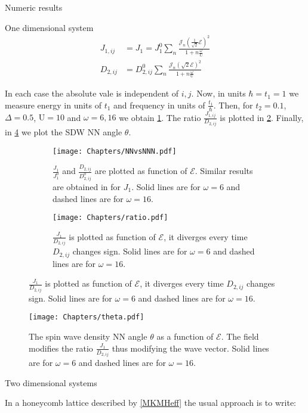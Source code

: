 \begin{section}{Numeric results}
\begin{subsection}{One dimensional system}
\begin{align}
J_{1,ij} &= J_{1} = J_{1}^0  \sum_{n} \frac{\mathcal{J}_n(\frac{1}{\sqrt{2}}\mathcal{E})^2}{1+n\frac{\omega}{\text{U}}} \\
D_{2,ij} &= D_{2,ij}^0  \sum_{n} \frac{\mathcal{J}_n(\sqrt{2}\mathcal{E})^2}{1+n\frac{\omega}{\text{U}}}
\end{align}

In each case the absolute vale is independent of $i,j$.  Now, in units $\hbar=t_1=1$ we measure energy in units of $t_1$ and frequency in units of $\frac{t_1}{\hbar}$. Then, for $t_2 = 0.1$, $\Delta = 0.5$, $\text{U} = 10$ and $\omega = 6, 16$ we obtain \ref{Fig1:NNvsNNN}. The ratio $\frac{J_{1,ij}}{D_{2,ij}}$ is plotted in \ref{Fig1:ratio}. Finally, in \ref{Fig2} we plot the SDW NN angle $\theta$.

\begin{figure}
\centering
\begin{subfigure}{.45\textwidth}
  \texttt{[image: Chapters/NNvsNNN.pdf]}
  \caption{$\frac{J_{1}}{J_{1}^0}$ and $\frac{D_{2,ij}}{D_{2,ij}^0}$ are plotted as function of $\mathcal{E}$. Similar results are obtained in \cite{Mentink2015} for $J_{1}$. Solid lines are for $\omega = 6$ and dashed lines are for $\omega = 16$.}
  \label{Fig1:NNvsNNN}
\end{subfigure}%
\hspace*{\fill}
\begin{subfigure}{.45\textwidth}
  \texttt{[image: Chapters/ratio.pdf]}
  \caption{$\frac{J_{1}}{D_{2,ij}}$ is plotted as function of $\mathcal{E}$, it diverges every time $D_{2,ij}$ changes sign. Solid lines are for $\omega = 6$ and dashed lines are for $\omega = 16$.}
  \label{Fig1:ratio}
\end{subfigure}
\label{Fig1}
\end{figure}

\begin{figure}
\centering
  \texttt{[image: Chapters/theta.pdf]}
  \caption{The spin wave density NN angle $\theta$ as a function of $\mathcal{E}$. The field modifies the ratio $\frac{J_{1}}{D_{2,ij}}$ thus modifying the wave vector. Solid lines are for $\omega = 6$ and dashed lines are for $\omega = 16$.}
\label{Fig2}
\end{figure}

\end{subsection}

\begin{subsection}{Two dimensional systems}
 
In a honeycomb lattice described by \ref{MKMHeff} the usual approach is to write:



\end{subsection}

\end{section}

